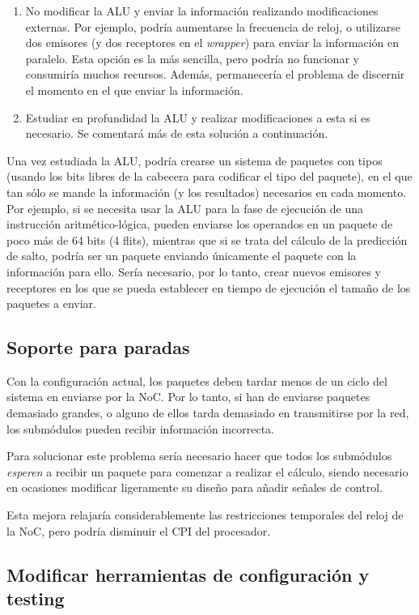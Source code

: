 \begin{enumerate}
    \item No modificar la ALU y enviar la información realizando modificaciones externas. Por ejemplo, podría aumentarse la frecuencia de reloj, o utilizarse dos emisores (y dos receptores en el \textit{wrapper}) para enviar la información en paralelo. Esta opción es la más sencilla, pero podría no funcionar y consumiría muchos recursos. Además, permanecería el problema de discernir el momento en el que enviar la información.
    \item Estudiar en profundidad la ALU y realizar modificaciones a esta si es necesario. Se comentará más de esta solución a continuación.
\end{enumerate}

Una vez estudiada la ALU, podría crearse un sistema de paquetes con tipos (usando los bits libres de la cabecera para codificar el tipo del paquete), en el que tan sólo se mande la información (y los resultados) necesarios en cada momento. Por ejemplo, si se necesita usar la ALU para la fase de ejecución de una instrucción aritmético-lógica, pueden enviarse los operandos en un paquete de poco más de 64 bits (4 flits), mientras que si se trata del cálculo de la predicción de salto, podría ser un paquete enviando únicamente el paquete con la información para ello. Sería necesario, por lo tanto, crear nuevos emisores y receptores en los que se pueda establecer en tiempo de ejecución el tamaño de los paquetes a enviar.

\subsection{Soporte para paradas}
Con la configuración actual, los paquetes deben tardar menos de un ciclo del sistema en enviarse por la NoC. Por lo tanto, si han de enviarse paquetes demasiado grandes, o alguno de ellos tarda demasiado en transmitirse por la red, los submódulos pueden recibir información incorrecta.

Para solucionar este problema sería necesario hacer que todos los submódulos \textit{esperen} a recibir un paquete para comenzar a realizar el cálculo, siendo necesario en ocasiones modificar ligeramente su diseño para añadir señales de control.

Esta mejora relajaría considerablemente las restricciones temporales del reloj de la NoC, pero podría disminuir el CPI del procesador.

\subsection{Modificar herramientas de configuración y testing}

